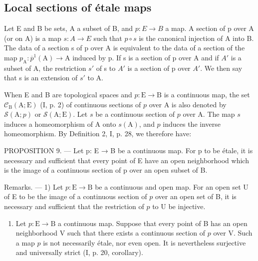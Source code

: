 \subsection{Local sections of étale maps}

Let E and B be sets, A a subset of B, and \(p: E \rightarrow B\) a map. A section of p over A (or on A) is a map \(s: A \rightarrow E\) such that \(p \circ s\) is the canonical injection of A into B. The data of a section s of p over A is equivalent to the data of a section of the map \(p_{\mathrm{A}} \colon \overline{p}^{1}(\mathrm{A}) \to \mathrm{A}\) induced by p. If s is a section of p over A and if \(A'\) is a subset of A, the restriction \(s'\) of s to \(A'\) is a section of p over \(A'\). We then say that s is an extension of \(s'\) to A.

When E and B are topological spaces and \(p \colon \mathrm{E} \to \mathrm{B}\) is a continuous map, the set \(\mathcal{C}_{\mathrm{B}}(\mathrm{A};\mathrm{E})\) (I, p. 2) of continuous sections of \(p\) over A is also denoted by \(\mathcal{S}(\mathrm{A};p)\) or \(\mathcal{S}(\mathrm{A};\mathrm{E})\). Let \(s\) be a continuous section of \(p\) over A. The map \(s\) induces a homeomorphism of A onto \(s(\mathrm{A})\), and \(p\) induces the inverse homeomorphism. By Definition 2, I, p. 28, we therefore have:

PROPOSITION 9. --- Let p: E → B be a continuous map. For p to be étale, it is necessary and sufficient that every point of E have an open neighborhood which is the image of a continuous section of p over an open subset of B.

Remarks. --- 1) Let \(p \colon \mathrm{E} \to \mathrm{B}\) be a continuous and open map. For an open set U of E to be the image of a continuous section of \(p\) over an open set of B, it is necessary and sufficient that the restriction of \(p\) to U be injective.

\begin{enumerate}
\def\labelenumi{\arabic{enumi})}
\setcounter{enumi}{1}
\tightlist
\item
  Let \(p \colon \mathrm{E} \to \mathrm{B}\) a continuous map. Suppose that every point of B has an open neighborhood V such that there exists a continuous section of \(p\) over V. Such a map \(p\) is not necessarily étale, nor even open. It is nevertheless surjective and universally strict (I, p. 20, corollary).
\end{enumerate}

